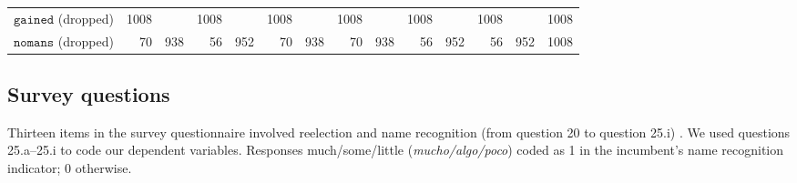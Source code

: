 \documentclass[letter,12pt]{article}
\begin{document}
{\begin{tabular}{c|rr|rr|rr|rr|rr|rr|r}
$\texttt{gained}$ (dropped)   & 1008 & & 1008 & & 1008 & & 1008 & & 1008 & & 1008 && 1008 \\
$\texttt{nomans}$ (dropped)   &  70 & 938 &  56 & 952 &  70 & 938 &  70 & 938 &  56 & 952 &  56 & 952 & 1008  \\ \hline
\end{tabular}
}


\subsection{Survey questions}\label{s:tran}
Thirteen items in the survey questionnaire involved reelection and name recognition (from question 20 to question 25.i) . We used questions 25.a--25.i to code our dependent variables. Responses much/some/little (\emph{mucho/algo/poco}) coded as 1 in the incumbent's name recognition indicator; 0 otherwise.
\end{document}
